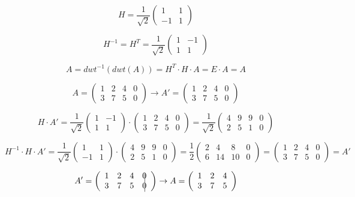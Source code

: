 \documentclass[russian,12pt,a4paper]{article}
\newcommand{\vpmark}[1]{\begin{tikzpicture}[overlay,remember picture]\node(#1)at (.3em,5ex){};\end{tikzpicture}}
\newcommand{\vsmark}[1]{\begin{tikzpicture}[overlay,remember picture]\draw(#1)--(.3em,-1ex);\end{tikzpicture}}
\begin{document}
	\[H = \frac{1}{\sqrt{2}}\left( 
	\begin{array}{ccc} 
		1 & 1 \\ 
		-1 & 1 		 
	\end{array} 
	\right)\] 
	
		\[H^{-1} = H^T = \frac{1}{\sqrt{2}}\left( 
	\begin{array}{ccc} 
		1 & -1 \\ 
		1 & 1 		 
	\end{array} 
	\right)\] 
	
	$$A = dwt^{-1}(dwt(A)) = H^T\cdot H\cdot A = E \cdot A = A $$
	
	\[A = \left( 
	\begin{array}{ccc|c} 
		1 & 2 & 4 & 0 \\ 
		3 & 7 & 5 & 0
	\end{array} 
	\right) \to A' = \left( 
	\begin{array}{cccc} 
		1 & 2 & 4 & 0 \\ 
		3 & 7 & 5 & 0
	\end{array} 
	\right)\] 
	
	\[H \cdot A' = \frac{1}{\sqrt{2}}\left( 
	\begin{array}{ccc} 
		1 & -1 \\ 
		1 & 1 		 
	\end{array} 
	\right) \cdot \left( 
	\begin{array}{cccc} 
		1 & 2 & 4 & 0 \\ 
		3 & 7 & 5 & 0
	\end{array} 
	\right) = \frac{1}{\sqrt{2}} \left( 
	\begin{array}{cccc} 
		4 & 9 & 9 & 0 \\ 
		2 & 5 & 1 & 0
	\end{array} 
	\right) \]
	
	\[H^{-1} \cdot H \cdot A' = \frac{1}{\sqrt{2}}\left( 
	\begin{array}{ccc} 
		1 & 1 \\ 
		-1 & 1 		 
	\end{array} 
	\right) \cdot \left( 
	\begin{array}{cccc} 
		4 & 9 & 9 & 0 \\ 
		2 & 5 & 1 & 0
	\end{array} 
	\right) = \frac{1}{2} \left( 
	\begin{array}{cccc} 
		2 & 4 & 8 & 0 \\ 
		6 & 14 & 10 & 0
	\end{array} 
	\right) = \left( 
	\begin{array}{cccc} 
		1 & 2 & 4 & 0 \\ 
		3 & 7 & 5 & 0
	\end{array} 
	\right) = A' \]
	
	\[A' = \left( 
	\begin{array}{cccc} 
		1 & 2 & 4 & \vpmark{b}0 \\ 
		3 & 7 & 5 & \vsmark{b}0
	\end{array} 
	\right) \to A = \left( 
	\begin{array}{ccc} 
		1 & 2 & 4 \\ 
		3 & 7 & 5
	\end{array} 
	\right)\] 
	
\end{document}
